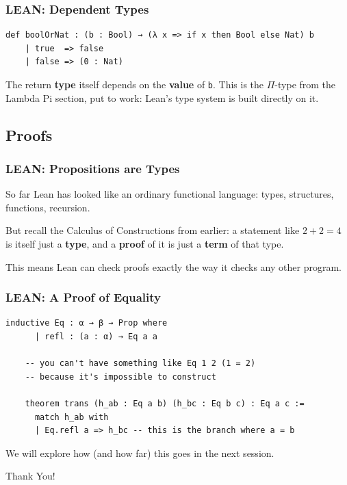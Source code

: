 \documentclass{beamer}
\begin{document}
\begin{frame}[fragile]
  \frametitle{LEAN: Dependent Types}

  \begin{lstlisting}[language=lean]
    def boolOrNat : (b : Bool) → (λ x => if x then Bool else Nat) b
    | true  => false
    | false => (0 : Nat)
  \end{lstlisting}

  \vspace{5mm}

  The return \textbf{type} itself depends on the \textbf{value} of \texttt{b}. This is the $\Pi$-type from the Lambda Pi section, put to work: Lean's type system is built directly on it.
\end{frame}

\subsection{Proofs}

\begin{frame}
  \frametitle{LEAN: Propositions are Types}

  So far Lean has looked like an ordinary functional language: types, structures, functions, recursion.

  \vspace{5mm}

  But recall the Calculus of Constructions from earlier: a statement like $2 + 2 = 4$ is itself just a \textbf{type}, and a \textbf{proof} of it is just a \textbf{term} of that type.

  \vspace{5mm}

  This means Lean can check proofs exactly the way it checks any other program.
\end{frame}

\begin{frame}[fragile]
  \frametitle{LEAN: A Proof of Equality}

  \begin{lstlisting}[language=lean]
    inductive Eq : α → β → Prop where
      | refl : (a : α) → Eq a a

    -- you can't have something like Eq 1 2 (1 = 2)
    -- because it's impossible to construct

    theorem trans (h_ab : Eq a b) (h_bc : Eq b c) : Eq a c :=
      match h_ab with
      | Eq.refl a => h_bc -- this is the branch where a = b
  \end{lstlisting}

  \vspace{5mm}

  We will explore how (and how far) this goes in the next session.
\end{frame}

\begin{frame}
  \centering
  \vfill
  {\Huge Thank You!}
  \vfill
\end{frame}
\end{document}
